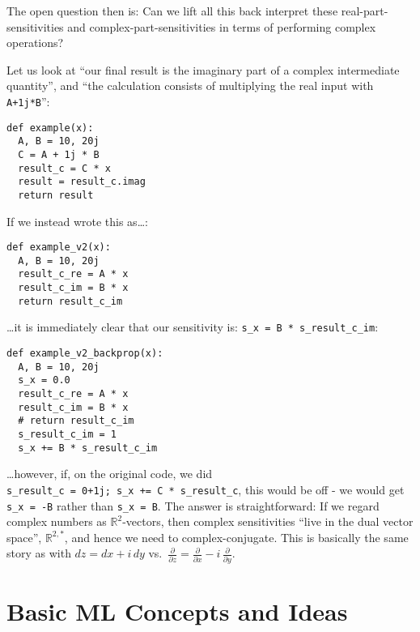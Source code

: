 \documentclass[11pt]{article}
\begin{document}
The open question then is: Can we lift all this back interpret these
real-part-sensitivities and complex-part-sensitivities in terms of
performing complex operations?

Let us look at ``our final result is the imaginary part of a complex
intermediate quantity'', and ``the calculation consists of multiplying
the real input with \texttt{A+1j*B}'':

\begin{verbatim}
def example(x):
  A, B = 10, 20j
  C = A + 1j * B
  result_c = C * x
  result = result_c.imag
  return result
\end{verbatim}

If we instead wrote this as\ldots:

\begin{verbatim}
def example_v2(x):
  A, B = 10, 20j
  result_c_re = A * x
  result_c_im = B * x
  return result_c_im
\end{verbatim}

\ldots it is immediately clear that our sensitivity is:
\texttt{s\_x\ =\ B\ *\ s\_result\_c\_im}:

\begin{verbatim}
def example_v2_backprop(x):
  A, B = 10, 20j
  s_x = 0.0
  result_c_re = A * x
  result_c_im = B * x
  # return result_c_im
  s_result_c_im = 1
  s_x += B * s_result_c_im
\end{verbatim}

\ldots however, if, on the original code, we did
\texttt{s\_result\_c\ =\ 0+1j;\ s\_x\ +=\ C\ *\ s\_result\_c}, this
would be off - we would get \texttt{s\_x\ =\ -B} rather than
\texttt{s\_x\ =\ B}. The answer is straightforward: If we regard complex
numbers as \({\mathbb R}^2\)-vectors, then complex sensitivities ``live
in the dual vector space'', \({\mathbb R}^{2,*}\), and hence we need to
complex-conjugate. This is basically the same story as with
\(dz=dx+i\,dy\)
vs.~\(\frac{\partial}{\partial z} = \frac{\partial}{\partial x}-i\,\frac{\partial}{\partial y}\).


    
    
    

    
    
    
    

    
    \hypertarget{basic-ml-concepts-and-ideas}{%
\section{Basic ML Concepts and
Ideas}\label{basic-ml-concepts-and-ideas}}
\end{document}
